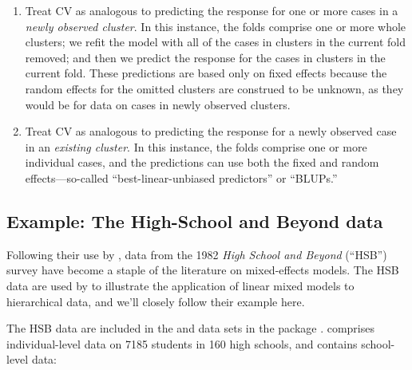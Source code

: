 \documentclass[
]{jss}
\begin{document}
\begin{enumerate}
\def\labelenumi{\arabic{enumi}.}
\item
  Treat CV as analogous to predicting the response for one or more cases
  in a \emph{newly observed cluster}. In this instance, the folds
  comprise one or more whole clusters; we refit the model with all of
  the cases in clusters in the current fold removed; and then we predict
  the response for the cases in clusters in the current fold. These
  predictions are based only on fixed effects because the random effects
  for the omitted clusters are construed to be unknown, as they would be
  for data on cases in newly observed clusters.
\item
  Treat CV as analogous to predicting the response for a newly observed
  case in an \emph{existing cluster}. In this instance, the folds
  comprise one or more individual cases, and the predictions can use
  both the fixed and random effects---so-called ``best-linear-unbiased
  predictors'' or ``BLUPs.''
\end{enumerate}

\subsection{Example: The High-School and Beyond
data}\label{example-the-high-school-and-beyond-data}

Following their use by \citet{RaudenbushBryk:2002}, data from the 1982
\emph{High School and Beyond} (``HSB'') survey have become a staple of
the literature on mixed-effects models. The HSB data are used by
\citet[Sec. 7.2.2]{FoxWeisberg:2019} to illustrate the application of
linear mixed models to hierarchical data, and we'll closely follow their
example here.

The HSB data are included in the  and
 data sets in the  package
\citep{PinheiroBates:2000}.  comprises
individual-level data on 7185 students in 160 high schools, and
 contains school-level data:
\end{document}
